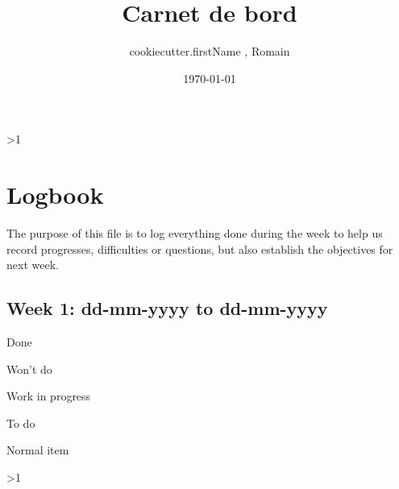 \documentclass[a4paper]{article}  %
\title{Carnet de bord}
\author{ {{cookiecutter.firstName}} \famName{ {{cookiecutter.familyName}} }, Romain \famName{Noël} }
\date{\today}
\newcommand{\Pathbasebib}{\PathR/ref_RN.bib,\PathR/ref_XX.bib}%
\begin{document}

\ifnum\value{levelstanda}>1
	{}%
\else
	\maketitle
\fi


\section{Logbook}
	The purpose of this file is to log everything done during the week to help us record progresses, difficulties or questions, but also establish the objectives for next week.


\subsection{Week 1: dd-mm-yyyy to dd-mm-yyyy}
	\begin{todolist}
		\item[\done] Done
		\item[\wontdo] Won't do
		\item[\wip] Work in progress
		\item[\todos] To do
		\item Normal item
	\end{todolist}


\ifnum\value{levelstanda}>1
	{}%
\else

	\printunsrtglossary[type=acronym]
	\printunsrtglossary[type=symbol]
\fi

\addtocounter{levelstanda}{-1}
\end{document}
